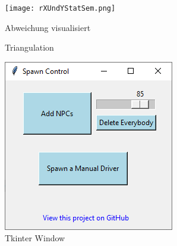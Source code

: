 
\begin{figure}[H]
  \centering\texttt{[image: rXUndYStatSem.png]}
  \caption{Abweichung visualisiert\cite{statistikSeminar}}
  \label{fig:rUndXY}
\end{figure}

\begin{figure}
    \vspace{-25pt}
    \vspace{-20pt}
  \caption{Triangulation \cite{poleTagging}}
  \label{fig:triang}
    \vspace{-6pt}
\end{figure}

\begin{figure}[!tbp]
  \centering
  \begin{minipage}[b]{0.4\textwidth}
    \includegraphics[width=\textwidth]{chapters/chapter6_bruno/Figures/ui1.png}
    \caption{Tkinter Window}
    \label{6fig:ui}
  \end{minipage}
  \hfill
  \begin{minipage}[b]{0.5\textwidth}

\end{minipage}
\end{figure}
